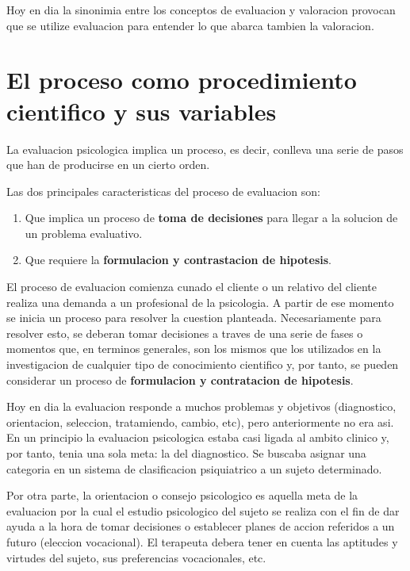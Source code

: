 \documentclass[12pt,a4paper]{article}
\begin{document}
Hoy en dia la sinonimia entre los conceptos de evaluacion y valoracion provocan que se utilize evaluacion para entender lo que abarca tambien la valoracion. 

\section{El proceso como procedimiento cientifico y sus variables}%

La evaluacion psicologica implica un proceso, es decir, conlleva una serie de pasos que han de producirse en un cierto orden.

Las dos principales caracteristicas del proceso de evaluacion son:

\begin{enumerate}
	\item Que implica un proceso de \textbf{toma de decisiones} para llegar a la solucion de un problema evaluativo.
	\item Que requiere la \textbf{formulacion y contrastacion de hipotesis}.
\end{enumerate}

El proceso de evaluacion comienza cunado el cliente o un relativo del cliente realiza una demanda a un profesional de la psicologia. A partir de ese momento se inicia un proceso para resolver la cuestion planteada. Necesariamente para resolver esto, se deberan tomar decisiones a traves de una serie de fases o momentos que, en terminos generales, son los mismos que los utilizados en la investigacion de cualquier tipo de conocimiento cientifico y, por tanto, se pueden considerar un proceso de \textbf{formulacion y contratacion de hipotesis}. 

Hoy en dia la evaluacion responde a muchos problemas y objetivos (diagnostico, orientacion, seleccion, tratamiendo, cambio, etc), pero anteriormente no era asi. En un principio la evaluacion psicologica estaba casi ligada al ambito clinico y, por tanto, tenia una sola meta: la del diagnostico. Se buscaba asignar una categoria en un sistema de clasificacion psiquiatrico a un sujeto determinado.  

Por otra parte, la orientacion o consejo psicologico es aquella meta de la evaluacion por la cual el estudio psicologico del sujeto se realiza con el fin de dar ayuda a la hora de tomar decisiones o establecer planes de accion referidos a un futuro (eleccion vocacional). El terapeuta debera tener en cuenta las aptitudes y virtudes del sujeto, sus preferencias vocacionales, etc. 
\end{document}
